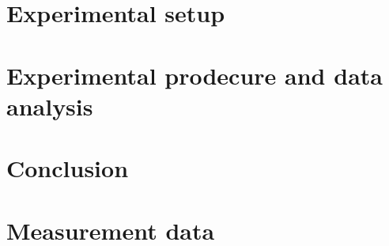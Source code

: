 \documentclass[
    oneside, 
    footinclude=off, 
    captions=tableheading, 
    DIV=12;usenames,
    dvipsnames
]{scrartcl}
\begin{document}
\newpage
\section{Experimental setup}
    

\newpage
\section{Experimental prodecure and data analysis}
    

\newpage
\section{Conclusion}
    


\newpage
    
\newpage
    \listoffigures
    \listoftables


\newpage
    \section*{Measurement data}
    
\newpage
    


%
\end{document}
